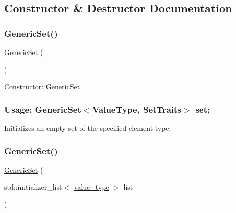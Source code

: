 \subsection{Constructor \& Destructor Documentation}
\mbox{\label{classstanfordcpplib_1_1collections_1_1GenericSet_a509ac9cd7429d3187594beced88d4921}} 
\subsubsection{\texorpdfstring{Generic\+Set()}{GenericSet()}\hspace{0.1cm}{\footnotesize\ttfamily [1/4]}}
{\footnotesize\ttfamily \mbox{\hyperlink{classstanfordcpplib_1_1collections_1_1GenericSet}{Generic\+Set}} (\begin{DoxyParamCaption}{ }\end{DoxyParamCaption})\hspace{0.3cm}{\ttfamily [default]}}



Constructor\+: \mbox{\hyperlink{classstanfordcpplib_1_1collections_1_1GenericSet}{Generic\+Set}} \subsubsection*{Usage\+: Generic\+Set$<$\+Value\+Type, Set\+Traits$>$ set; }

Initializes an empty set of the specified element type. 

\mbox{\label{classstanfordcpplib_1_1collections_1_1GenericSet_a6bac19c4194012a2724702caf3a15e20}} 
\subsubsection{\texorpdfstring{Generic\+Set()}{GenericSet()}\hspace{0.1cm}{\footnotesize\ttfamily [2/4]}}
{\footnotesize\ttfamily \mbox{\hyperlink{classstanfordcpplib_1_1collections_1_1GenericSet}{Generic\+Set}} (\begin{DoxyParamCaption}\item[{std\+::initializer\+\_\+list$<$ \mbox{\hyperlink{classstanfordcpplib_1_1collections_1_1GenericSet_a669c81f158766925e7293f97c0099b28}{value\+\_\+type}} $>$}]{list }\end{DoxyParamCaption})}



